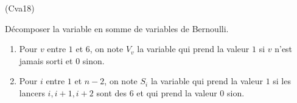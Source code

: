 \begin{tiny}(Cva18)\end{tiny} Décomposer la variable en somme de variables de Bernoulli.
\begin{enumerate}
 \item Pour $v$ entre $1$ et $6$, on note $V_v$ la variable qui prend la valeur $1$ si $v$ n'est jamais sorti et $0$ sinon.
 \item Pour $i$ entre $1$ et $n-2$, on note $S_i$ la variable qui prend la valeur $1$ si les lancers $i,i+1,i+2$ sont des $6$ et qui prend la valeur $0$ sion.
\end{enumerate}
 